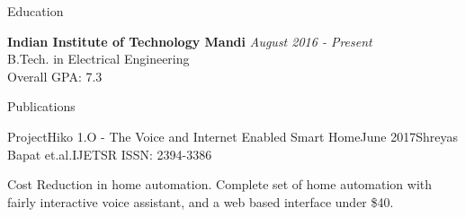 \documentclass{resume} %
\begin{document}

\begin{rSection}{Education}

{\bf Indian Institute of Technology Mandi} \hfill {\em August 2016  - Present} \\ 
B.Tech. in Electrical Engineering \\
Overall GPA:  7.3 

\end{rSection}

\begin{rSection}{Publications}


\begin{rSubsection}{ProjectHiko 1.O - The Voice and Internet Enabled Smart Home}{June 2017}{Shreyas Bapat et.al.}{IJETSR ISSN: 2394-3386}
\item Cost Reduction in home automation. Complete set of home automation with fairly interactive voice assistant, and a web based interface under \$40. 
 \end{rSubsection}
\end{rSection}

\end{document}
